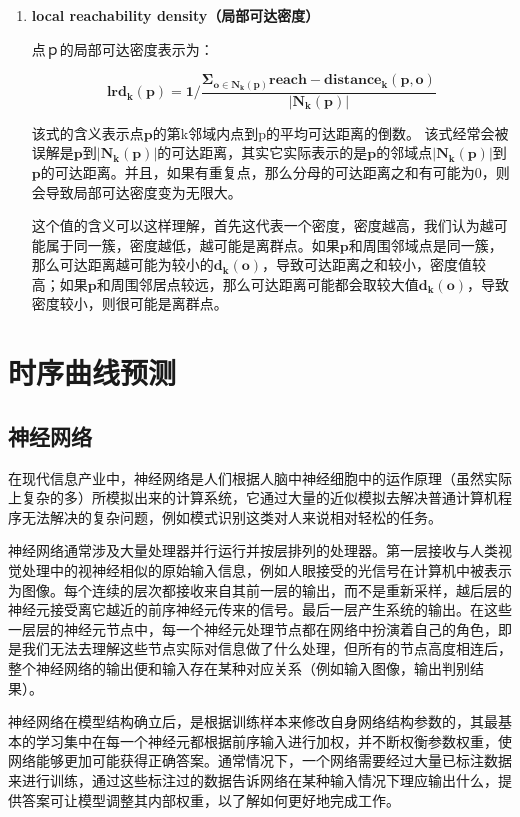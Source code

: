 \documentclass[a4paper,AutoFakeBold,oneside,12pt]{book}
\begin{document}
\begin{enumerate}
	\item \textbf{ local reachability density（局部可达密度）}

	点ｐ的局部可达密度表示为：

	\begin{equation}
	\bm{lrd_k(p)}=\bm{1}/\frac{\bm{\Sigma_{o\in N_k(p)} reach-distance_k(p,o)}}{\bm{|N_k(p)|}}
	\end{equation}

	该式的含义表示点$\bm{p}$的第k邻域内点到p的平均可达距离的倒数。 该式经常会被误解是$\bm{p}$到$\bm{|N_k(p)|}$的可达距离，其实它实际表示的是$\bm{p}$的邻域点$\bm{|N_k(p)|}$到$\bm{p}$的可达距离。并且，如果有重复点，那么分母的可达距离之和有可能为0，则会导致局部可达密度变为无限大。

	这个值的含义可以这样理解，首先这代表一个密度，密度越高，我们认为越可能属于同一簇，密度越低，越可能是离群点。如果$\bm{p}$和周围邻域点是同一簇，那么可达距离越可能为较小的$\bm{d_k(o)}$，导致可达距离之和较小，密度值较高；如果$\bm{p}$和周围邻居点较远，那么可达距离可能都会取较大值$\bm{d_k(o)}$，导致密度较小，则很可能是离群点。 
	\end{enumerate}
	
\section{时序曲线预测}
\subsection{神经网络}
	在现代信息产业中，神经网络是人们根据人脑中神经细胞中的运作原理（虽然实际上复杂的多）所模拟出来的计算系统，它通过大量的近似模拟去解决普通计算机程序无法解决的复杂问题，例如模式识别这类对人来说相对轻松的任务\cite{韩力群2005人工神经网络理论}。

	神经网络通常涉及大量处理器并行运行并按层排列的处理器。第一层接收与人类视觉处理中的视神经相似的原始输入信息，例如人眼接受的光信号在计算机中被表示为图像。每个连续的层次都接收来自其前一层的输出，而不是重新采样，越后层的神经元接受离它越近的前序神经元传来的信号。最后一层产生系统的输出。在这些一层层的神经元节点中，每一个神经元处理节点都在网络中扮演着自己的角色，即是我们无法去理解这些节点实际对信息做了什么处理，但所有的节点高度相连后，整个神经网络的输出便和输入存在某种对应关系（例如输入图像，输出判别结果）。

	神经网络在模型结构确立后，是根据训练样本来修改自身网络结构参数的，其最基本的学习集中在每一个神经元都根据前序输入进行加权，并不断权衡参数权重，使网络能够更加可能获得正确答案。通常情况下，一个网络需要经过大量已标注数据来进行训练，通过这些标注过的数据告诉网络在某种输入情况下理应输出什么，提供答案可让模型调整其内部权重，以了解如何更好地完成工作。
\end{document}
